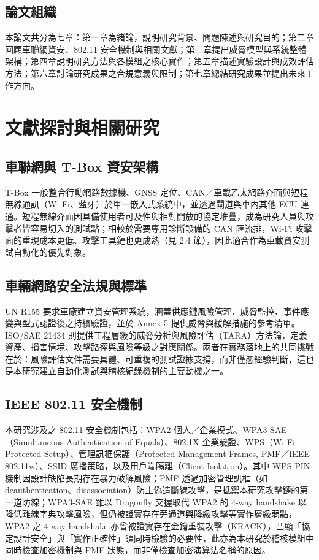 \documentclass[12pt,a4paper,oneside]{report}
\begin{document}
\section{論文組織}
本論文共分為七章：第一章為緒論，說明研究背景、問題陳述與研究目的；第二章回顧車聯網資安、802.11 安全機制與相關文獻；第三章提出威脅模型與系統整體架構；第四章說明研究方法與各模組之核心實作；第五章描述實驗設計與成效評估方法；第六章討論研究成果之合規意義與限制；第七章總結研究成果並提出未來工作方向。

\chapter{文獻探討與相關研究}

\section{車聯網與 T-Box 資安架構}
T-Box 一般整合行動網路數據機、GNSS 定位、CAN／車載乙太網路介面與短程無線通訊（Wi-Fi、藍牙）於單一嵌入式系統中，並透過閘道與車內其他 ECU 連通。短程無線介面因具備使用者可及性與相對開放的協定堆疊，成為研究人員與攻擊者皆容易切入的測試點；相較於需要專用診斷設備的 CAN 匯流排，Wi-Fi 攻擊面的重現成本更低、攻擊工具鏈也更成熟（見 2.4 節），因此適合作為車載資安測試自動化的優先對象\cite{ma2022telematics}。

\section{車輛網路安全法規與標準}
UN R155 要求車廠建立資安管理系統，涵蓋供應鏈風險管理、威脅監控、事件應變與型式認證後之持續驗證，並於 Annex 5 提供威脅與緩解措施的參考清單\cite{unr155}。ISO/SAE 21434 則提供工程層級的威脅分析與風險評估（TARA）方法論，定義資產、損害情境、攻擊路徑與風險等級之對應關係\cite{iso21434,cht2022iso21434}。兩者在實務落地上的共同挑戰在於：風險評估文件需要具體、可重複的測試證據支撐，而非僅憑經驗判斷，這也是本研究建立自動化測試與稽核紀錄機制的主要動機之一。

\section{IEEE 802.11 安全機制}
本研究涉及之 802.11 安全機制包括：WPA2 個人／企業模式、WPA3-SAE（Simultaneous Authentication of Equals）、802.1X 企業驗證、WPS（Wi-Fi Protected Setup）、管理訊框保護（Protected Management Frames, PMF／IEEE 802.11w）、SSID 廣播策略，以及用戶端隔離（Client Isolation）\cite{ieee80211}。其中 WPS PIN 機制因設計缺陷長期存在暴力破解風險；PMF 透過加密管理訊框（如 deauthentication、disassociation）防止偽造斷線攻擊，是抵禦本研究攻擊鏈的第一道防線；WPA3-SAE 雖以 Dragonfly 交握取代 WPA2 的 4-way handshake 以降低離線字典攻擊風險，但仍被證實存在旁通道與降級攻擊等實作層級弱點\cite{vanhoef2020dragonblood}，WPA2 之 4-way handshake 亦曾被證實存在金鑰重裝攻擊（KRACK）\cite{vanhoef2017krack}，凸顯「協定設計安全」與「實作正確性」須同時檢驗的必要性，此亦為本研究於稽核模組中同時檢查加密機制與 PMF 狀態，而非僅檢查加密演算法名稱的原因。
\end{document}
